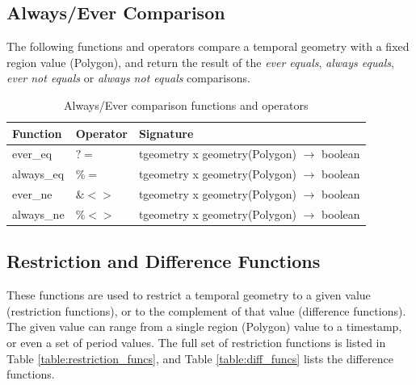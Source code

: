 \subsection{Always/Ever Comparison}
\label{section:always_ever}

The following functions and operators compare a temporal geometry with a fixed region value (Polygon), and return the result of the \textit{ever equals}, \textit{always equals}, \textit{ever not equals} or \textit{always not equals} comparisons. \\


\begin{table}[h!]
    \centering
    \begin{tabularx}{\textwidth}{|l|l|X|}
    \hline
    \textbf{Function}   & \textbf{Operator} & \textbf{Signature} \\
    \hline
    ever\_eq    & $?=$      & tgeometry x geometry(Polygon) $\rightarrow$ boolean \\
    \hline
    always\_eq  & $\%=$     & tgeometry x geometry(Polygon) $\rightarrow$ boolean \\
    \hline
    ever\_ne    & $\&<>$    & tgeometry x geometry(Polygon) $\rightarrow$ boolean \\
    \hline
    always\_ne  & $\%<>$    & tgeometry x geometry(Polygon) $\rightarrow$ boolean \\
    \hline
    \end{tabularx}
    \caption{Always/Ever comparison functions and operators}
    \label{table:always_ever_funcs}
\end{table}

\subsection{Restriction and Difference Functions}
\label{section:restriction_and_difference}

These functions are used to restrict a temporal geometry to a given value (restriction functions), or to the complement of that value (difference functions). The given value can range from a single region (Polygon) value to a timestamp, or even a set of period values. The full set of restriction functions is listed in Table \ref{table:restriction_funcs}, and Table \ref{table:diff_funcs} lists the difference functions.

